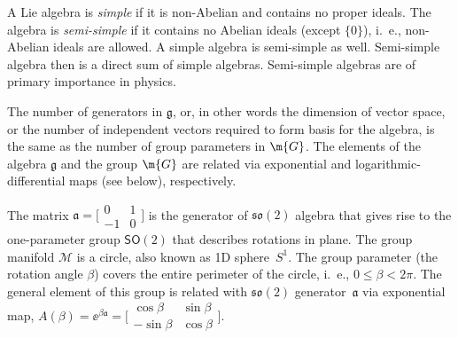 \begin{unit}
A Lie algebra is {\it simple} if it  is non-Abelian and contains
no proper ideals. The algebra is {\it semi-simple} if it contains
no Abelian ideals (except $\{0\}$), i.~e., non-Abelian ideals are
allowed. A simple algebra is semi-simple as well. Semi-simple
algebra then is a direct sum of simple algebras. Semi-simple algebras
are of primary importance in physics.


The number  of generators in $\mathfrak{g}$, or, in other words
the dimension of vector space, or the number of independent
vectors required to form basis for the algebra,  is the same as
the number of group parameters in $\m{G}$. The elements of the
algebra $\mathfrak{g}$ and the group $\m{G}$ are related via
exponential and logarithmic-differential maps (see below),
respectively.
\end{unit}
%
\begin{example}\label{so2}
The matrix
$\mathfrak{a}=\bigl[\begin{smallmatrix}0&1\\-1&0\end{smallmatrix}\bigr]$ is
the generator of $\mathfrak{so}(2)$ algebra that gives rise to the
one-parameter group $\mathsf{SO}(2)$ that describes rotations in
plane. The group manifold $\mathcal{M}$ is a circle, also known as
1D sphere~$S^1$. The group parameter (the rotation angle $\beta$)
covers the entire perimeter of the circle, i.~e., $0\le\beta<
2\pi$. The general element of this group is related with
$\mathfrak{so}(2)$ generator~$\mathfrak{a}$ via exponential map,
$A(\beta)=\ee^{\beta \mathfrak{a}}=
\bigl[\begin{smallmatrix}\cos\beta&\sin\beta\\-\sin\beta&\cos\beta\end{smallmatrix}\bigr]$.
\end{example}
%
